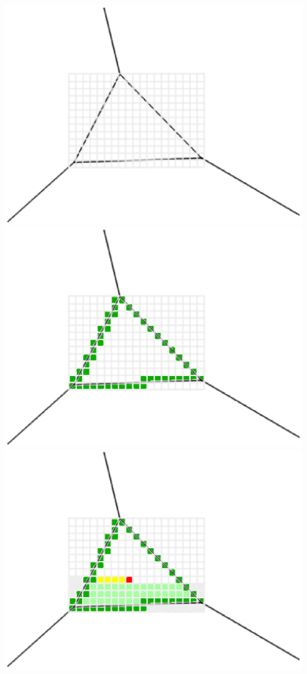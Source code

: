 \includegraphics[scale=0.2]{../img/voxelize_1.eps}
\includegraphics[scale=0.2]{../img/voxelize_2.eps}
\includegraphics[scale=0.2]{../img/voxelize_3.eps}

